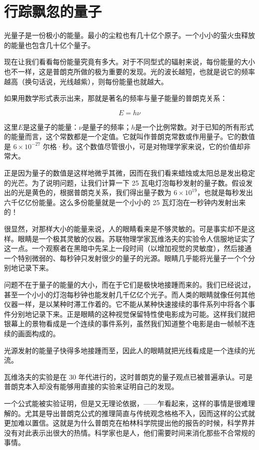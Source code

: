 \section{行踪飘忽的量子}

光量子是一份极小的能量。最小的尘粒也有几十亿个原子。一个小小的萤火虫释放的能量也包含几十亿个量子。

现在让我们看看每份能量究竟有多大。对于不同型式的辐射来说，每份能量的大小也不一样，这是普朗克所做的极为重要的发现。光的波长越短，也就是说它的频率越高（换句话说，光线越紫），则每份能量也就越大。

如果用数学形式表示出来，那就是著名的频率与量子能量的普朗克关系：

$$E=h \nu$$

这里$E$是这量子的能量：$\nu$是量子的频率；$h$是一个比例常数。对于已知的所有形式的能量而言，这个常数都是一个定值。它就叫作普朗克常数或作用量子。它的数值是 $6 \times 10^{-27}$ 尔格·秒。这个数值尽管很小，可是对物理学家来说，它的价值却非常大。

正是因为量子的数值是这样地微乎其微，因而在我们看来蜡烛或太阳总是发出稳定的光芒。为了说明问题，让我们计算一下 25 瓦电灯泡每秒发射的量子数。假设发出的光是黄色的，根据普朗克关系，我们得出量子数为 $ 6 \times 10^{19} $，也就是每秒发出六千亿亿份能量。这么多份能量就是一个小小的 25 瓦灯泡在一秒钟内发射出来的！

很显然，对那样大小的能量来说，人的眼睛看来是不够灵敏的。可是事实却不是这样。眼睛是一个极其灵敏的仪器。苏联物理学家瓦维洛夫的实验令人信服地证实了这一点。一个观察者在黑暗中先呆上一段时间（以增加视觉的灵敏度），然后接通一个特别微弱的、每秒钟只发射很少的量子的光源。眼睛几乎能将光量子一个个分别地记录下来。

问题不在于量子的能量的大小，而在于它们是极快地接踵而来的。我们已经说过，甚至一个小小的灯泡每秒钟也能发射几千亿亿个光子。而人类的眼睛就像任何其他仪器一样，是以某种时滞工作着的。它不能从某种快速接续的事件系列中将各个事件分别地记录下来。正是眼睛的这种视觉保留特性使电影成为可能。这样我们就把银幕上的景物看成是一个连续的事件系列，虽然我们知道整个电影是由一帧帧不连续的画面构成的。

光源发射的能量子快得多地接踵而至，因此人的眼睛就把光线看成是一个连续的光流。

瓦维洛夫的实验是在 30 年代进行的，这时普朗克的量子观点已被普遍承认。可是普朗克本入却没有能够用直接的实验来证明自己的发现。

一个公式能被实验证明，但是又无理论依据，——乍看起来，这样的事情是很难理解的。尤其是导出普朗克公式的推理简直与传统观念格格不入，因而这样的公式就更加难以置信。这就是为什么普朗克在柏林科学院提出他的报告的时候，科学界并没有对此表示出很大的热情。科学家也是人，他们需要时间来消化那些不合常规的事情。

